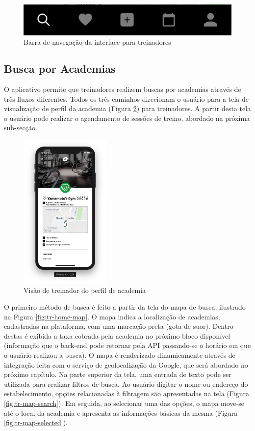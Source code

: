 \begin{figure}[H]
    \centering
    \includegraphics{pfc/figuras/tr-tabbar.png}
    \caption{Barra de navegação da interface para treinadores}
    \label{fig:tr-tabbar}
\end{figure}

\subsection{Busca por Academias}
O aplicativo permite que treinadores realizem buscas por academias através de três fluxos diferentes. Todos os três caminhos direcionam o usuário para a tela de visualização de perfil da academia (Figura \ref{fig:tr-gym-profile-view}) para treinadores. A partir desta tela o usuário pode realizar o agendamento de sessões de treino, abordado na próxima sub-secção.

\begin{figure}[H]
    \centering
    \includegraphics[width=0.4\textwidth]{pfc/figuras/tr-gym-profile-view.png}
    \caption{Visão de treinador do perfil de academia}
    \label{fig:tr-gym-profile-view}
\end{figure}

O primeiro método de busca é feito a partir da tela do mapa de busca, ilustrado na Figura \ref{fig:tr-home-map}. O mapa indica a localização de academias, cadastradas na plataforma, com uma marcação preta (gota de suor). Dentro destas é exibida a taxa cobrada pela academia no próximo bloco disponível (informação que o back-end pode retornar pela API passando-se o horário em que o usuário realizou a busca). O mapa é renderizado dinamicamente através de integração feita com o serviço de geolocalização da Google, que será abordado no próximo capítulo. Na parte superior da tela, uma entrada de texto pode ser utilizada para realizar filtros de busca. Ao usuário digitar o nome ou endereço do estabelecimento, opções relacionadas à filtragem são apresentadas na tela (Figura \ref{fig:tr-map-search}). Em seguida, ao selecionar uma das opções, o mapa move-se até o local da academia e apresenta as informações básicas da mesma (Figura \ref{fig:tr-map-selected}).


